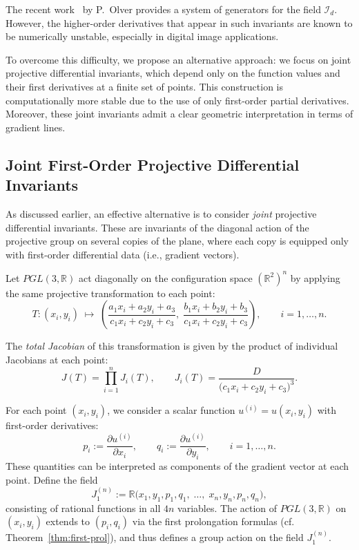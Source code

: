 \documentclass[12pt,reqno]{amsart}
\begin{document}
The recent work~\cite{Olver2023} by P.~Olver provides a system of generators for the field $\mathcal{I}_d$. However, the higher-order derivatives that appear in such invariants are known to be {numerically unstable}, especially in digital image applications.%

To overcome this difficulty,  we propose an alternative approach: we focus on joint projective differential invariants, which depend only on the function values and their first derivatives at a finite set of points. This construction is computationally more stable due to the use of only first-order partial derivatives. Moreover, these joint invariants admit a clear geometric interpretation in terms of gradient lines.



\subsection{Joint First-Order Projective Differential Invariants}

As discussed earlier, an effective alternative is to consider \textit{joint} projective differential invariants. These are invariants of the diagonal action of the projective group on several copies of the plane, where each copy is equipped only with first-order differential data (i.e., gradient vectors). 

Let 
$
PGL(3,\mathbb{R})
$
act diagonally on the configuration space 
$
(\mathbb{R}^{2})^n
$
by applying the same projective transformation to each point:
\begin{equation}
T: (x_i, y_i) \;\longmapsto\;
\left(
  \frac{a_1x_i + a_2y_i + a_3}{c_1x_i + c_2y_i + c_3},\;
  \frac{b_1x_i + b_2y_i + b_3}{c_1x_i + c_2y_i + c_3}
\right), \qquad i=1, \dots, n.
\end{equation}

The \textit{total Jacobian} of this transformation is given by the product of individual Jacobians at each point:
\[
J(T) = \prod_{i=1}^{n} J_i(T), \qquad
J_i(T) = \frac{D}{\bigl(c_1x_i + c_2y_i + c_3\bigr)^3}.
\]

For each point $(x_i, y_i)$, we consider a scalar function $u^{(i)} = u(x_i, y_i)$ with first-order derivatives:
\[
p_i := \frac{\partial u^{(i)}}{\partial x_i}, \qquad
q_i := \frac{\partial u^{(i)}}{\partial y_i}, \qquad i = 1,\dots,n.
\]
These quantities can be interpreted as components of the gradient vector at each point. Define the field
\[
J^{(n)}_1 := \mathbb{R}\bigl(x_1, y_1, p_1, q_1,\; \dots,\; x_n, y_n, p_n, q_n\bigr),
\]
consisting of rational functions in all $4n$ variables. The action of $PGL(3,\mathbb{R})$ on $(x_i, y_i)$ extends to $(p_i, q_i)$ via the first prolongation formulas (cf. Theorem~\ref{thm:first-prol}), and thus defines a group action on the field $J^{(n)}_1$.
\end{document}
